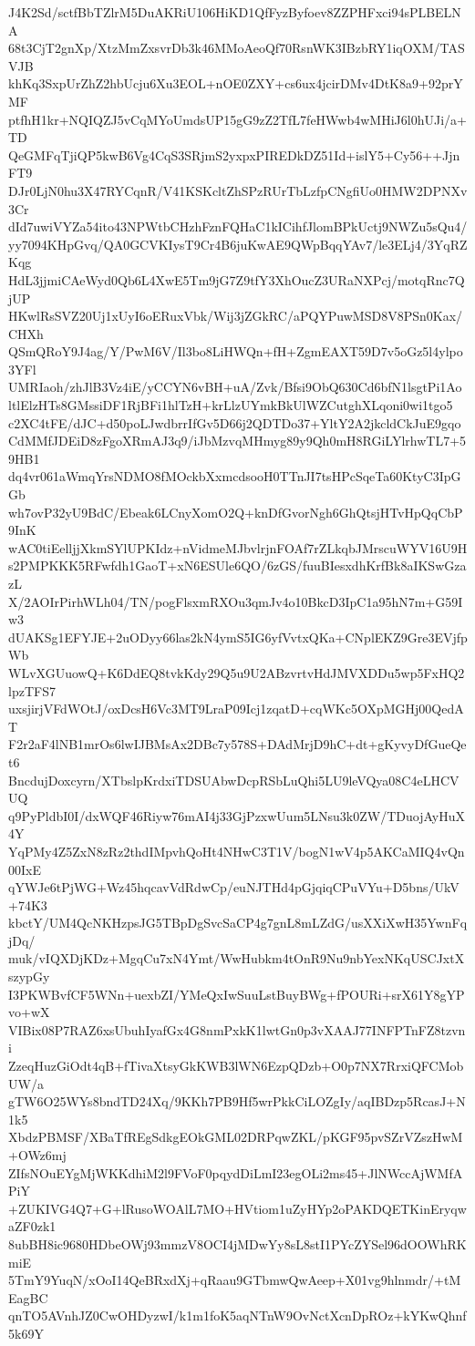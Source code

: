 J4K2Sd/sctfBbTZlrM5DuAKRiU106HiKD1QfFyzByfoev8ZZPHFxci94sPLBELNA
68t3CjT2gnXp/XtzMmZxsvrDb3k46MMoAeoQf70RsnWK3IBzbRY1iqOXM/TASVJB
khKq3SxpUrZhZ2hbUcju6Xu3EOL+nOE0ZXY+cs6ux4jcirDMv4DtK8a9+92prYMF
ptfhH1kr+NQIQZJ5vCqMYoUmdsUP15gG9zZ2TfL7feHWwb4wMHiJ6l0hUJi/a+TD
QeGMFqTjiQP5kwB6Vg4CqS3SRjmS2yxpxPIREDkDZ51Id+islY5+Cy56++JjnFT9
DJr0LjN0hu3X47RYCqnR/V41KSKcltZhSPzRUrTbLzfpCNgfiUo0HMW2DPNXv3Cr
dId7uwiVYZa54ito43NPWtbCHzhFznFQHaC1kICihfJlomBPkUctj9NWZu5sQu4/
yy7094KHpGvq/QA0GCVKIysT9Cr4B6juKwAE9QWpBqqYAv7/le3ELj4/3YqRZKqg
HdL3jjmiCAeWyd0Qb6L4XwE5Tm9jG7Z9tfY3XhOucZ3URaNXPcj/motqRnc7QjUP
HKwlRsSVZ20Uj1xUyI6oERuxVbk/Wij3jZGkRC/aPQYPuwMSD8V8PSn0Kax/CHXh
QSmQRoY9J4ag/Y/PwM6V/Il3bo8LiHWQn+fH+ZgmEAXT59D7v5oGz5l4ylpo3YFl
UMRIaoh/zhJlB3Vz4iE/yCCYN6vBH+uA/Zvk/Bfsi9ObQ630Cd6bfN1lsgtPi1Ao
ltlElzHTs8GMssiDF1RjBFi1hlTzH+krLlzUYmkBkUlWZCutghXLqoni0wi1tgo5
c2XC4tFE/dJC+d50poLJwdbrrIfGv5D66j2QDTDo37+YltY2A2jkcldCkJuE9gqo
CdMMfJDEiD8zFgoXRmAJ3q9/iJbMzvqMHmyg89y9Qh0mH8RGiLYlrhwTL7+59HB1
dq4vr061aWmqYrsNDMO8fMOckbXxmcdsooH0TTnJI7tsHPcSqeTa60KtyC3IpGGb
wh7ovP32yU9BdC/Ebeak6LCnyXomO2Q+knDfGvorNgh6GhQtsjHTvHpQqCbP9InK
wAC0tiEelljjXkmSYlUPKIdz+nVidmeMJbvlrjnFOAf7rZLkqbJMrscuWYV16U9H
s2PMPKKK5RFwfdh1GaoT+xN6ESUle6QO/6zGS/fuuBIesxdhKrfBk8aIKSwGzazL
X/2AOIrPirhWLh04/TN/pogFlsxmRXOu3qmJv4o10BkcD3IpC1a95hN7m+G59Iw3
dUAKSg1EFYJE+2uODyy66las2kN4ymS5IG6yfVvtxQKa+CNplEKZ9Gre3EVjfpWb
WLvXGUuowQ+K6DdEQ8tvkKdy29Q5u9U2ABzvrtvHdJMVXDDu5wp5FxHQ2lpzTFS7
uxsjirjVFdWOtJ/oxDcsH6Vc3MT9LraP09Icj1zqatD+cqWKc5OXpMGHj00QedAT
F2r2aF4lNB1mrOs6lwIJBMsAx2DBc7y578S+DAdMrjD9hC+dt+gKyvyDfGueQet6
BncdujDoxcyrn/XTbslpKrdxiTDSUAbwDcpRSbLuQhi5LU9leVQya08C4eLHCVUQ
q9PyPldbI0I/dxWQF46Riyw76mAI4j33GjPzxwUum5LNsu3k0ZW/TDuojAyHuX4Y
YqPMy4Z5ZxN8zRz2thdIMpvhQoHt4NHwC3T1V/bogN1wV4p5AKCaMIQ4vQn00IxE
qYWJe6tPjWG+Wz45hqcavVdRdwCp/euNJTHd4pGjqiqCPuVYu+D5bns/UkV+74K3
kbctY/UM4QcNKHzpsJG5TBpDgSvcSaCP4g7gnL8mLZdG/usXXiXwH35YwnFqjDq/
muk/vIQXDjKDz+MgqCu7xN4Ymt/WwHubkm4tOnR9Nu9nbYexNKqUSCJxtXszypGy
I3PKWBvfCF5WNn+uexbZI/YMeQxIwSuuLstBuyBWg+fPOURi+srX61Y8gYPvo+wX
VIBix08P7RAZ6xsUbuhIyafGx4G8nmPxkK1lwtGn0p3vXAAJ77INFPTnFZ8tzvni
ZzeqHuzGiOdt4qB+fTivaXtsyGkKWB3lWN6EzpQDzb+O0p7NX7RrxiQFCMobUW/a
gTW6O25WYs8bndTD24Xq/9KKh7PB9Hf5wrPkkCiLOZgIy/aqIBDzp5RcasJ+N1k5
XbdzPBMSF/XBaTfREgSdkgEOkGML02DRPqwZKL/pKGF95pvSZrVZszHwM+OWz6mj
ZIfsNOuEYgMjWKKdhiM2l9FVoF0pqydDiLmI23egOLi2ms45+JlNWccAjWMfAPiY
+ZUKIVG4Q7+G+lRusoWOAlL7MO+HVtiom1uZyHYp2oPAKDQETKinEryqwaZF0zk1
8ubBH8ic9680HDbeOWj93mmzV8OCI4jMDwYy8sL8stI1PYcZYSel96dOOWhRKmiE
5TmY9YuqN/xOoI14QeBRxdXj+qRaau9GTbmwQwAeep+X01vg9hlnmdr/+tMEagBC
qnTO5AVnhJZ0CwOHDyzwI/k1m1foK5aqNTnW9OvNctXcnDpROz+kYKwQhnf5k69Y
